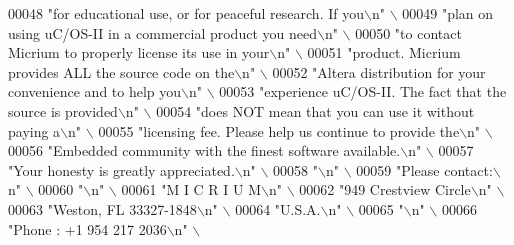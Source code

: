 \begin{DoxyCode}
00048 \textcolor{preprocessor}{    "for educational use, or for peaceful research. If you\(\backslash\)n"                  \(\backslash\)}
00049 \textcolor{preprocessor}{    "plan on using uC/OS-II in a commercial product you need\(\backslash\)n"                \(\backslash\)}
00050 \textcolor{preprocessor}{    "to contact Micrium to properly license its use in your\(\backslash\)n"                 \(\backslash\)}
00051 \textcolor{preprocessor}{    "product. Micrium provides ALL the source code on the\(\backslash\)n"                   \(\backslash\)}
00052 \textcolor{preprocessor}{    "Altera distribution for your convenience and to help you\(\backslash\)n"               \(\backslash\)}
00053 \textcolor{preprocessor}{    "experience uC/OS-II. The fact that the source is provided\(\backslash\)n"              \(\backslash\)}
00054 \textcolor{preprocessor}{    "does NOT mean that you can use it without paying a\(\backslash\)n"                     \(\backslash\)}
00055 \textcolor{preprocessor}{    "licensing fee. Please help us continue to provide the\(\backslash\)n"                  \(\backslash\)}
00056 \textcolor{preprocessor}{    "Embedded community with the finest software available.\(\backslash\)n"                 \(\backslash\)}
00057 \textcolor{preprocessor}{    "Your honesty is greatly appreciated.\(\backslash\)n"                                   \(\backslash\)}
00058 \textcolor{preprocessor}{    "\(\backslash\)n"                                                                       \(\backslash\)}
00059 \textcolor{preprocessor}{    "Please contact:\(\backslash\)n"                                                        \(\backslash\)}
00060 \textcolor{preprocessor}{    "\(\backslash\)n"                                                                       \(\backslash\)}
00061 \textcolor{preprocessor}{    "M I C R I U M\(\backslash\)n"                                                          \(\backslash\)}
00062 \textcolor{preprocessor}{    "949 Crestview Circle\(\backslash\)n"                                                   \(\backslash\)}
00063 \textcolor{preprocessor}{    "Weston,  FL 33327-1848\(\backslash\)n"                                                 \(\backslash\)}
00064 \textcolor{preprocessor}{    "U.S.A.\(\backslash\)n"                                                                 \(\backslash\)}
00065 \textcolor{preprocessor}{    "\(\backslash\)n"                                                                       \(\backslash\)}
00066 \textcolor{preprocessor}{    "Phone : +1 954 217 2036\(\backslash\)n"                                                \(\backslash\)}

\end{DoxyCode}
